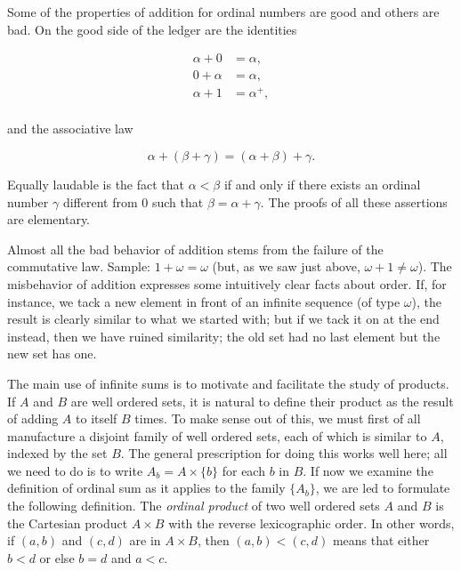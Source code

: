 Some of the properties of addition for ordinal numbers are good and others are bad. On the good side of the ledger are the identities 

\begin{align*}
\alpha + 0 &= \alpha , \\
0 + \alpha &= \alpha , \\
\alpha + 1 &= \alpha^{+} ,\\
\end{align*}

and the associative law 

\begin{equation*}
\alpha + (\beta + \gamma) = (\alpha + \beta) + \gamma .
\end{equation*}

Equally laudable is the fact that $\alpha < \beta$ if and only if there exists an ordinal number $\gamma$ different from $0$ such that $\beta =  \alpha + \gamma$. The proofs of all these assertions are elementary. 

Almost all the bad behavior of addition stems from the failure of the commutative law. Sample: $1 + \omega = \omega$ (but, as we saw just above, $\omega + 1 \neq \omega$). The misbehavior of addition expresses some intuitively clear facts about order. If, for instance, we tack a new element in front of an infinite sequence (of type $\omega$), the result is clearly similar to what we started with; but if we tack it on at the end instead, then we have ruined similarity; the old set had no last element but the new set has one. 

The main use of infinite sums is to motivate and facilitate the study of products. If $A$ and $B$ are well ordered sets, it is natural to define their product as the result of adding $A$ to itself $B$ times. To make sense out of this, we must first of all manufacture a disjoint family of well ordered sets, each of which is similar to $A$, indexed by the set $B$. The general prescription for doing this works well here; all we need to do is to write $A_{b} = A \times \{  b \}$ for each $b$ in $B$. If now we examine the definition of ordinal sum as it applies to the family $\{ A_{b} \}$, we are led to formulate the following definition. The \textit{ordinal product} of two well ordered sets $A$ and $B$ is the Cartesian product $A \times B$ with the reverse lexicographic order. In other words, if $(a,b)$ and $(c, d)$ are in $A \times B$, then $(a, b) < (c, d)$ means that either $b < d$ or else $b = d$ and $a < c$. 

